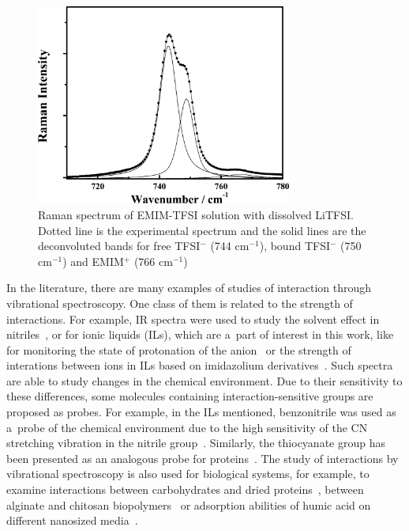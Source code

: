\begin{figure}
    \centering
    \includegraphics[width=0.75\textwidth]{img/1-introduction/ir-interactions-example.png}
    \caption[Raman spectrum of EMIM-TFSI solution with dissolved LiTFSI~\cite{li-interactions-4}]{Raman spectrum of EMIM-TFSI solution with dissolved LiTFSI. Dotted line is the experimental spectrum and the solid lines are the deconvoluted bands for free TFSI$^{-}$ (744 cm$^{-1}$), bound TFSI$^{-}$ (750 cm$^{-1}$) and EMIM$^{+}$ (766 cm$^{-1}$)~\cite{li-interactions-4}}
    \label{fig:1-ir-interactions-example}
\end{figure}

In the literature, there are many examples of studies of interaction through vibrational spectroscopy. One class of them is related to the strength of interactions. For example, IR spectra were used to study the solvent effect in nitriles~\cite{ir-interactions-10}, or for ionic liquids (ILs), which are a~part of interest in this work, like for monitoring the state of protonation of the anion~\cite{ir-interactions-11} or the strength of interations between ions in ILs based on imidazolium derivatives~\cite{ir-interactions-12}. Such spectra are able to study changes in the chemical environment. Due to their sensitivity to these differences, some molecules containing interaction-sensitive groups are proposed as probes. For example, in the ILs mentioned, benzonitrile was used as a~probe of the chemical environment due to the high sensitivity of the CN stretching vibration in the nitrile group~\cite{ir-interactions-13}. Similarly, the thiocyanate group has been presented as an analogous probe for proteins~\cite{ir-interactions-14}. The study of interactions by vibrational spectroscopy is also used for biological systems, for example, to examine interactions between carbohydrates and dried proteins~\cite{ir-interactions-1}, between alginate and chitosan biopolymers~\cite{ir-interactions-6} or adsorption abilities of humic acid on different nanosized media~\cite{ir-interactions-7}.

